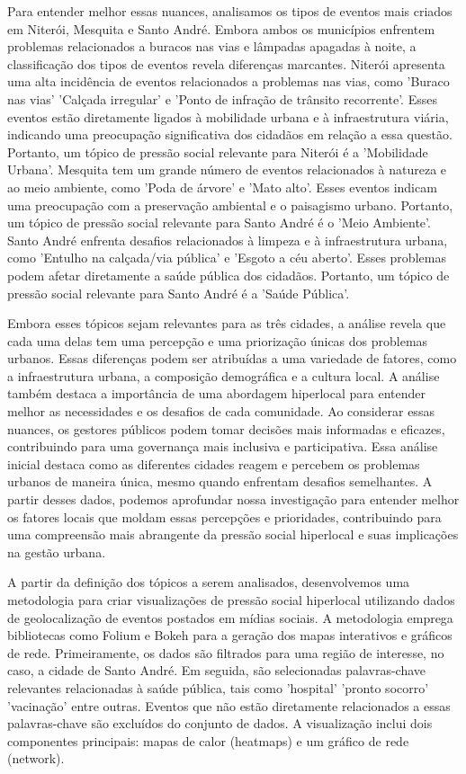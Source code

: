 Para entender melhor essas nuances, analisamos os tipos de eventos mais criados em Niterói, Mesquita e Santo André. Embora ambos os municípios enfrentem problemas relacionados a buracos nas vias e lâmpadas apagadas à noite, a classificação dos tipos de eventos revela diferenças marcantes. Niterói apresenta uma alta incidência de eventos relacionados a problemas nas vias, como 'Buraco nas vias' 'Calçada irregular' e 'Ponto de infração de trânsito recorrente'. Esses eventos estão diretamente ligados à mobilidade urbana e à infraestrutura viária, indicando uma preocupação significativa dos cidadãos em relação a essa questão. Portanto, um tópico de pressão social relevante para Niterói é a 'Mobilidade Urbana'. Mesquita tem um grande número de eventos relacionados à natureza e ao meio ambiente, como 'Poda de árvore' e 'Mato alto'. Esses eventos indicam uma preocupação com a preservação ambiental e o paisagismo urbano. Portanto, um tópico de pressão social relevante para Santo André é o 'Meio Ambiente'. Santo André enfrenta desafios relacionados à limpeza e à infraestrutura urbana, como 'Entulho na calçada/via pública' e 'Esgoto a céu aberto'. Esses problemas podem afetar diretamente a saúde pública dos cidadãos. Portanto, um tópico de pressão social relevante para Santo André é a 'Saúde Pública'.

Embora esses tópicos sejam relevantes para as três cidades, a análise revela que cada uma delas tem uma percepção e uma priorização únicas dos problemas urbanos. Essas diferenças podem ser atribuídas a uma variedade de fatores, como a infraestrutura urbana, a composição demográfica e a cultura local. A análise também destaca a importância de uma abordagem hiperlocal para entender melhor as necessidades e os desafios de cada comunidade. Ao considerar essas nuances, os gestores públicos podem tomar decisões mais informadas e eficazes, contribuindo para uma governança mais inclusiva e participativa. Essa análise inicial destaca como as diferentes cidades reagem e percebem os problemas urbanos de maneira única, mesmo quando enfrentam desafios semelhantes. A partir desses dados, podemos aprofundar nossa investigação para entender melhor os fatores locais que moldam essas percepções e prioridades, contribuindo para uma compreensão mais abrangente da pressão social hiperlocal e suas implicações na gestão urbana.

A partir da definição dos tópicos a serem analisados, desenvolvemos uma metodologia para criar visualizações de pressão social hiperlocal utilizando dados de geolocalização de eventos postados em mídias sociais. A metodologia emprega bibliotecas como Folium e Bokeh para a geração dos mapas interativos e gráficos de rede. Primeiramente, os dados são filtrados para uma região de interesse, no caso, a cidade de Santo André. Em seguida, são selecionadas palavras-chave relevantes relacionadas à saúde pública, tais como 'hospital' 'pronto socorro' 'vacinação' entre outras. Eventos que não estão diretamente relacionados a essas palavras-chave são excluídos do conjunto de dados. A visualização inclui dois componentes principais: mapas de calor (heatmaps) e um gráfico de rede (network).

